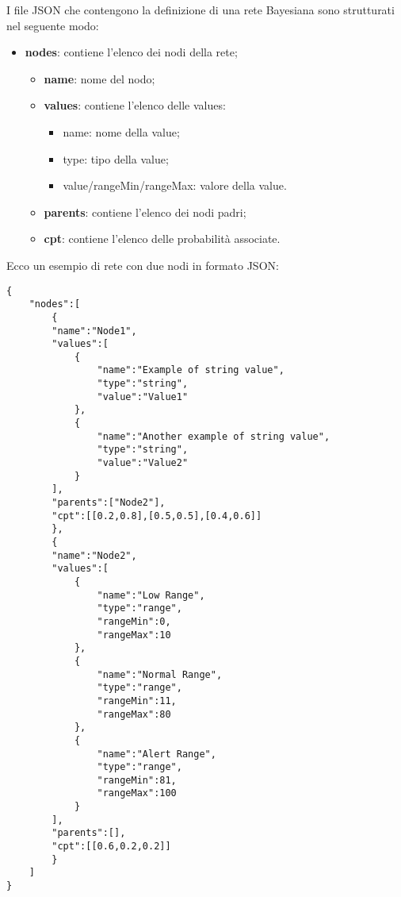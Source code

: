 \pagebreak
{}
I file JSON che contengono la definizione di una rete Bayesiana sono strutturati nel seguente modo:
\begin{itemize}
	\item \textbf{nodes}: contiene l'elenco dei nodi della rete;
	\begin{itemize}
		\item \textbf{name}: nome del nodo;
		\item \textbf{values}: contiene l'elenco delle values:
		\begin{itemize}
			\item name: nome della value;
			\item type: tipo della value;
			\item value/rangeMin/rangeMax: valore della value.
		\end{itemize}
		\item \textbf{parents}: contiene l'elenco dei nodi padri;
		\item \textbf{cpt}: contiene l'elenco delle probabilità associate.
	\end{itemize}
\end{itemize}
\Spazio
Ecco un esempio di rete con due nodi in formato JSON:
\begin{lstlisting}
{
	"nodes":[
		{
		"name":"Node1",
		"values":[
			{
				"name":"Example of string value",
				"type":"string",
				"value":"Value1"
			},
			{
				"name":"Another example of string value",
				"type":"string",
				"value":"Value2"
			}
		],
		"parents":["Node2"],
		"cpt":[[0.2,0.8],[0.5,0.5],[0.4,0.6]]
		},
		{
		"name":"Node2",
		"values":[
			{
				"name":"Low Range",
				"type":"range",
				"rangeMin":0,
				"rangeMax":10
			},
			{
				"name":"Normal Range",
				"type":"range",
				"rangeMin":11,
				"rangeMax":80
			},
			{
				"name":"Alert Range",
				"type":"range",
				"rangeMin":81,
				"rangeMax":100
			}
		],
		"parents":[],
		"cpt":[[0.6,0.2,0.2]]
		}
	]
}
\end{lstlisting}


